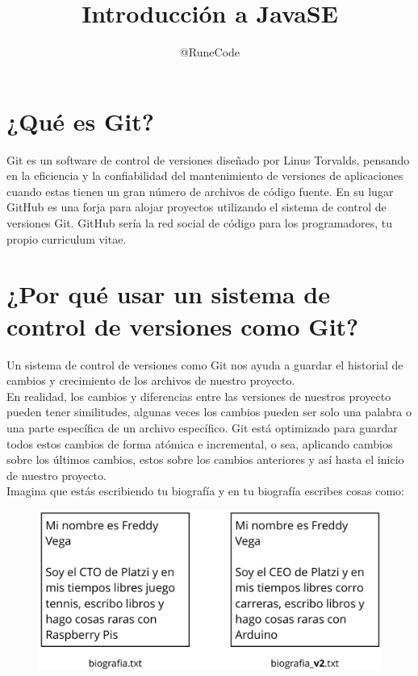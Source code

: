 \documentclass{article}
\title{Introducción a JavaSE}
\author{@RuneCode}
\begin{document}


\section{¿Qué es Git?}%
Git es un software de control de versiones diseñado por Linus Torvalds,
pensando en la eficiencia y la confiabilidad del mantenimiento de versiones de
aplicaciones cuando estas tienen un gran número de archivos de código fuente.
En su lugar GitHub es una forja para alojar proyectos utilizando el sistema de
control de versiones Git. GitHub sería la red social de código para los
programadores, tu propio curriculum vitae.\\

\section{¿Por qué usar un sistema de control de versiones como Git?}%
Un sistema de control de versiones como Git nos ayuda a guardar el historial de
cambios y crecimiento de los archivos de nuestro proyecto.\\

En realidad, los cambios y diferencias entre las versiones de nuestros proyecto
pueden tener similitudes, algunas veces los cambios pueden ser solo una palabra
o una parte específica de un archivo específico. Git está optimizado para
guardar todos estos cambios de forma atómica e incremental, o sea, aplicando
cambios sobre los últimos cambios, estos sobre los cambios anteriores y así
hasta el inicio de nuestro proyecto.\\

Imagina que estás escribiendo tu biografía y en tu biografía escribes cosas
como:

\begin{figure}[h!]
  \centering
  \includegraphics[scale=0.5]{./Pictures/001_no_git_example.png}
\end{figure}
\end{document}
